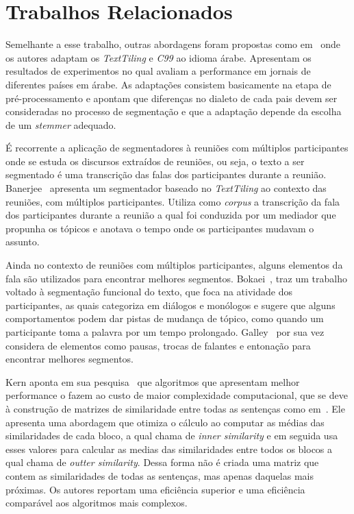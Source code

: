 \section{Trabalhos Relacionados}
	\label{sec:trabalhos}


Semelhante a esse trabalho, outras abordagens foram propostas como em~\cite{CHAIBI2014} onde os autores adaptam os \textit{TextTiling} e \textit{C99} ao idioma árabe. Apresentam os resultados de experimentos no qual avaliam a performance em jornais de diferentes países em árabe. As adaptações consistem basicamente na etapa de pré-processamento e apontam que diferenças no dialeto de cada pais devem ser consideradas no processo de segmentação e que a adaptação depende da escolha de um \textit{stemmer} adequado.

É recorrente a aplicação de segmentadores à reuniões com múltiplos participantes onde se estuda os discursos extraídos de reuniões, ou seja, o texto a ser segmentado é uma transcrição das falas dos participantes durante a reunião.
%
Banerjee~\cite{Banerjee2006} apresenta um segmentador baseado no  \textit{TextTiling} ao contexto das reuniões, com múltiplos participantes. Utiliza como \textit{corpus} a transcrição da fala dos participantes durante a reunião a qual foi conduzida por um mediador que propunha os tópicos e anotava o tempo onde os participantes mudavam o assunto. 

Ainda no contexto de reuniões com múltiplos participantes, alguns elementos da fala são utilizados para encontrar melhores segmentos.
%
Bokaei~\cite{Bokaei2015}, traz um trabalho voltado à segmentação funcional do texto, que foca na atividade dos participantes, as quais categoriza em diálogos e monólogos e sugere que alguns comportamentos podem dar pistas de mudança de tópico, como quando um participante toma a palavra por um tempo prolongado. 
Galley~\cite{Galley2003} por sua vez considera de elementos como pausas, trocas de falantes e entonação para encontrar melhores segmentos.

Kern aponta em sua pesquisa~\cite{Kern2009} que algoritmos que apresentam melhor performance o fazem ao custo de maior complexidade computacional, que se deve à construção de matrizes de similaridade entre todas as sentenças como em~\cite{Choi2000}. Ele apresenta uma abordagem que otimiza o cálculo ao computar as médias das similaridades de cada bloco, a qual chama de \textit{inner similarity} e em seguida usa esses valores para calcular as medias das similaridades entre todos os blocos a qual chama de \textit{outter similarity}. Dessa forma não é criada uma matriz que contem as similaridades de todas as sentenças, mas apenas daquelas mais próximas. Os autores reportam uma eficiência superior e uma eficiência comparável aos algoritmos mais complexos.


